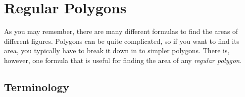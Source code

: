			\section{Regular Polygons}

As you may remember,
there are many different formulas to find the areas of different figures.
Polygons can be quite complicated, so if you want to find its area,
you typically have to break it down in to simpler polygons.
There is, however, one formula that is useful for finding the area
of any \emph{regular polygon}.

\subsection{Terminology}

